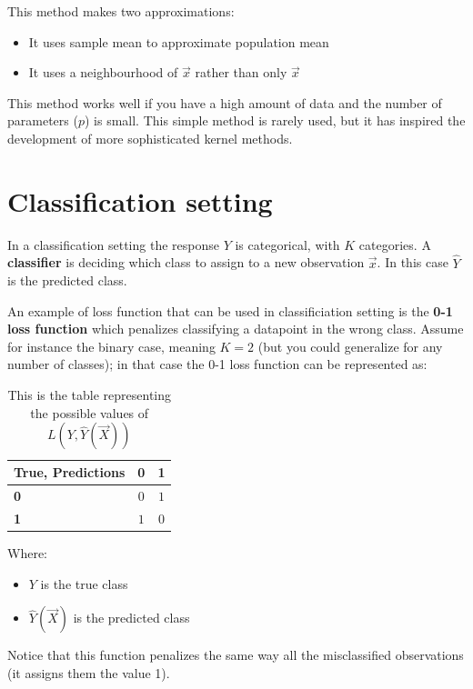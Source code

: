       This method makes two approximations:
      \begin{itemize}
        \item It uses sample mean to approximate population mean
        \item It uses a neighbourhood of $\vec{x}$ rather than only $\vec{x}$
      \end{itemize}
      
      This method works well if you have a high amount of data and the number of parameters ($p$) is small.
      This simple method is rarely used, but it has inspired the development of more sophisticated kernel methods.

  \section{Classification setting}
    In a classification setting the response $Y$ is categorical, with $K$ categories. 
    A \textbf{classifier} is deciding which class to assign to a new observation $\vec{x}$.
    In this case $\hat{Y}$ is the predicted class.
    
    An example of loss function that can be used in classificiation setting is the \textbf{0-1 loss function} which penalizes classifying a datapoint in the wrong class. Assume for instance the binary case, meaning $K = 2$ (but you could generalize for any number of classes); in that case the 0-1 loss function can be represented as:
    
\begin{table}
\centering
\begin{tabular}{|l||c|c|}
	\hline
	\textbf{True,
	Predictions} & \textbf{0} & \textbf{1} \\
	\hline
	\hline
	\textbf{0} &  $0$ & $1$ \\
	\hline
	\textbf{\textbf{1}} & $1$ & $0$\\
	\hline
\end{tabular}
\caption{This is the table representing the possible values of $ L(Y, \hat{Y}(\vec{X})) $}
\end{table} 
    
    Where:
    \begin{itemize}
      \item $Y$ is the true class
      \item $\hat{Y}(\vec{X})$ is the predicted class
    \end{itemize}
    Notice that this function penalizes the same way all the misclassified observations (it assigns them the value 1).  
    
